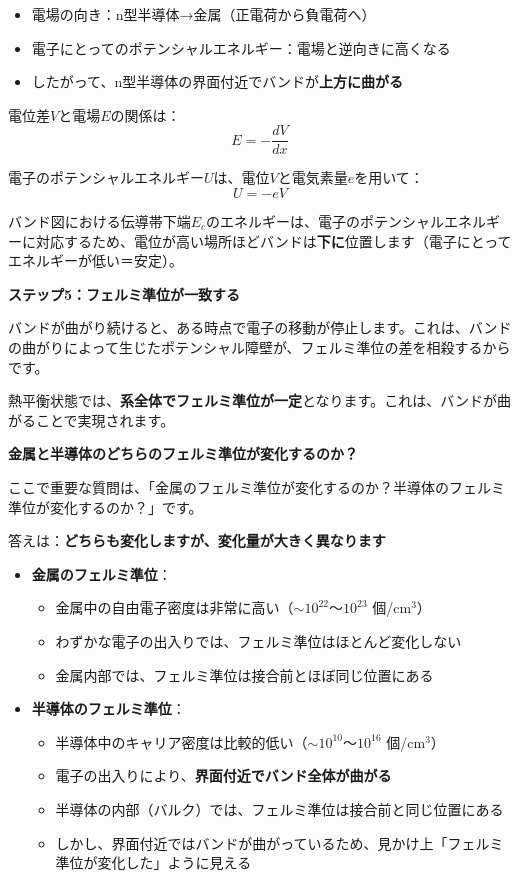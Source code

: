 \begin{itemize}
\item 電場の向き：n型半導体→金属（正電荷から負電荷へ）
\item 電子にとってのポテンシャルエネルギー：電場と逆向きに高くなる
\item したがって、n型半導体の界面付近でバンドが\textbf{上方に曲がる}
\end{itemize}

電位差$V$と電場$E$の関係は：
\begin{equation}
E = -\frac{dV}{dx}
\end{equation}

電子のポテンシャルエネルギー$U$は、電位$V$と電気素量$e$を用いて：
\begin{equation}
U = -eV
\end{equation}

バンド図における伝導帯下端$E_c$のエネルギーは、電子のポテンシャルエネルギーに対応するため、電位が高い場所ほどバンドは\textbf{下に}位置します（電子にとってエネルギーが低い＝安定）。

\textbf{ステップ5：フェルミ準位が一致する}

バンドが曲がり続けると、ある時点で電子の移動が停止します。これは、バンドの曲がりによって生じたポテンシャル障壁が、フェルミ準位の差を相殺するからです。

熱平衡状態では、\textbf{系全体でフェルミ準位が一定}となります。これは、バンドが曲がることで実現されます。

\textbf{金属と半導体のどちらのフェルミ準位が変化するのか？}

ここで重要な質問は、「金属のフェルミ準位が変化するのか？半導体のフェルミ準位が変化するのか？」です。

答えは：\textbf{どちらも変化しますが、変化量が大きく異なります}

\begin{itemize}
\item \textbf{金属のフェルミ準位}：
\begin{itemize}
\item 金属中の自由電子密度は非常に高い（$\sim 10^{22}$〜$10^{23}$ 個/cm$^3$）
\item わずかな電子の出入りでは、フェルミ準位はほとんど変化しない
\item 金属内部では、フェルミ準位は接合前とほぼ同じ位置にある
\end{itemize}

\item \textbf{半導体のフェルミ準位}：
\begin{itemize}
\item 半導体中のキャリア密度は比較的低い（$\sim 10^{10}$〜$10^{16}$ 個/cm$^3$）
\item 電子の出入りにより、\textbf{界面付近でバンド全体が曲がる}
\item 半導体の内部（バルク）では、フェルミ準位は接合前と同じ位置にある
\item しかし、界面付近ではバンドが曲がっているため、見かけ上「フェルミ準位が変化した」ように見える
\end{itemize}
\end{itemize}

